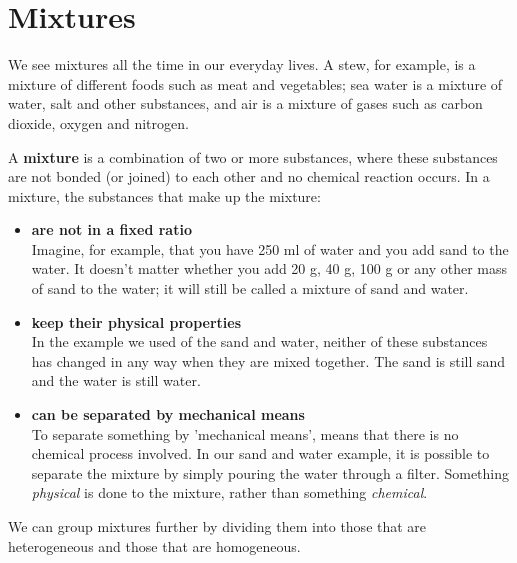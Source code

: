 \label{m38708*cid2}
            \section{Mixtures}
            \nopagebreak
            \label{m38708*id62584}We see mixtures all the time in our everyday lives. A stew, for example, is a mixture of different foods such as meat and vegetables; sea water is a mixture of water, salt and other substances, and air is a mixture of gases such as carbon dioxide, oxygen and nitrogen.\par 
\label{m38708*fhsst!!!underscore!!!id69}
 {\label{m38708*meaningfhsst!!!underscore!!!id69}
      A \textbf{mixture} is a combination of two or more substances, where these substances are not bonded (or joined) to each other and no chemical reaction occurs. 
       } 
      \label{m38708*id62612}In a mixture, the substances that make up the mixture:\par 
      \label{m38708*id62615}\begin{itemize}[noitemsep]
            \label{m38708*uid2}\item \textbf{are not in a fixed ratio} \\
Imagine, for example, that you have 250 ml of water and you add sand to the water. It doesn't matter whether you add 20 g, 40 g, 100 g or any other mass of sand to the water; it will still be called a mixture of sand and water.
\label{m38708*uid3}\item \textbf{keep their physical properties} \\
In the example we used of the sand and water, neither of these substances has changed in any way when they are mixed together. The sand is still sand and the water is still water.
\label{m38708*uid4}\item \textbf{can be separated by mechanical means} \\
To separate something by 'mechanical means', means that there is no chemical process involved. In our sand and water example, it is possible to separate the mixture by simply pouring the water through a filter. Something \textsl{physical} is done to the mixture, rather than something \textsl{chemical}.
\end{itemize}
      \label{m38708*id62700}We can group mixtures further by dividing them into those that are heterogeneous and those that are homogeneous.\par 

      \label{m38708*uid5}

